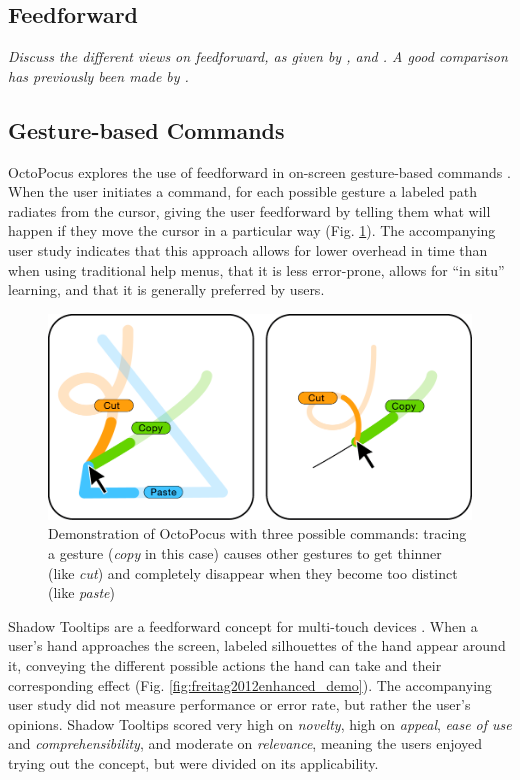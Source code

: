 \documentclass[a4paper,fancychapters]{article}
\begin{document}
	\subsection{Feedforward} \label{subsec:feedforward}
	\textit{Discuss the different views on feedforward, as given by \citeauthor{djajadiningrat2002but} \cite{djajadiningrat2002but}, \citeauthor{wensveen2004interaction} \cite{wensveen2004interaction} and \citeauthor{vermeulen2013crossing} \cite{vermeulen2013crossing}. A good comparison has previously been made by \citeauthor{chueke2016perceptible} \cite{chueke2016perceptible}.}

	\subsection{Gesture-based Commands} \label{subsec:gesture-based_commands}
	OctoPocus explores the use of feedforward in on-screen gesture-based commands \cite{bau2008octopocus}. When the user initiates a command, for each possible gesture a labeled path radiates from the cursor, giving the user feedforward by telling them what will happen if they move the cursor in a particular way (Fig. \ref{fig:bau2008octopocus_demo}). The accompanying user study indicates that this approach allows for lower overhead in time than when using traditional help menus, that it is less error-prone, allows for ``in situ'' learning, and that it is generally preferred by users.

	\begin{figure}
		\centering
		\includegraphics[width=0.7\linewidth]{img/bau2008octopocus/demo.png}
		\caption{Demonstration of OctoPocus with three possible commands: tracing a gesture (\textit{copy} in this case) causes other gestures to get thinner (like \textit{cut}) and completely disappear when they become too distinct (like \textit{paste}) \cite{bau2008octopocus}}
		\label{fig:bau2008octopocus_demo}
	\end{figure}

	Shadow Tooltips are a feedforward concept for multi-touch devices \cite{freitag2012enhanced}. When a user's hand approaches the screen, labeled silhouettes of the hand appear around it, conveying the different possible actions the hand can take and their corresponding effect (Fig. \ref{fig:freitag2012enhanced_demo}). The accompanying user study did not measure performance or error rate, but rather the user's opinions. Shadow Tooltips scored very high on \textit{novelty}, high on \textit{appeal}, \textit{ease of use} and \textit{comprehensibility}, and moderate on \textit{relevance}, meaning the users enjoyed trying out the concept, but were divided on its applicability.
\end{document}
